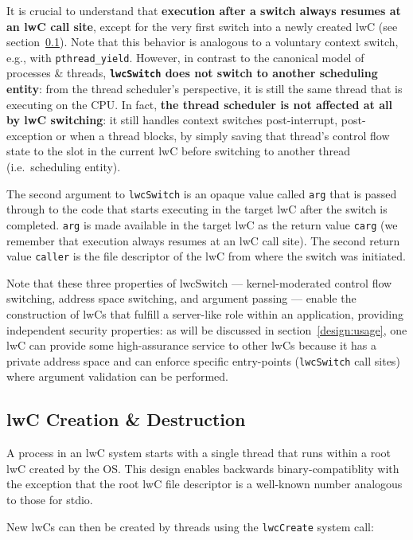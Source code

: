 \documentclass[10pt,twocolumn,letter]{article}
\begin{document}
It is crucial to understand that \textbf{execution after a switch always resumes at an lwC call site}, except for the very first switch into a newly created lwC (see section~\ref{design:createdestroy}).
Note that this behavior is analogous to a voluntary context switch, e.g., with \lstinline{pthread_yield}.
However, in contrast to the canonical model of processes \& threads, \textbf{\lstinline{lwcSwitch} does not switch to another scheduling entity}:
from the thread scheduler's perspective, it is still the same thread that is executing on the CPU.
In fact, \textbf{the thread scheduler is not affected at all by lwC switching}:
it still handles context switches post-interrupt, post-exception or when a thread blocks, by simply saving that thread's control flow state to the slot in the current lwC before switching to another thread (i.e.~scheduling entity).

The second argument to \lstinline{lwcSwitch} is an opaque value called \lstinline{arg} that is passed through to the code that starts executing in the target lwC after the switch is completed.
\lstinline{arg} is made available in the target lwC as the return value \lstinline{carg} (we remember that execution always resumes at an lwC call site).
The second return value \lstinline{caller} is the file descriptor of the lwC from where the switch was initiated.

Note that these three properties of lwcSwitch --- kernel-moderated control flow switching, address space switching, and argument passing --- enable the construction of lwCs that fulfill a server-like role within an application, providing independent security properties:
as will be discussed in section~\ref{design:usage}, one lwC can provide some high-assurance service to other lwCs because it has a private address space and can enforce specific entry-points (\lstinline{lwcSwitch} call sites) where argument validation can be performed.

\subsection{lwC Creation \& Destruction}\label{design:createdestroy}
A process in an lwC system starts with a single thread that runs within a root lwC created by the OS.
This design enables backwards binary-compatiblity with the exception that the root lwC file descriptor is a well-known number analogous to those for stdio.

New lwCs can then be created by threads using the \lstinline{lwcCreate} system call:
\end{document}
